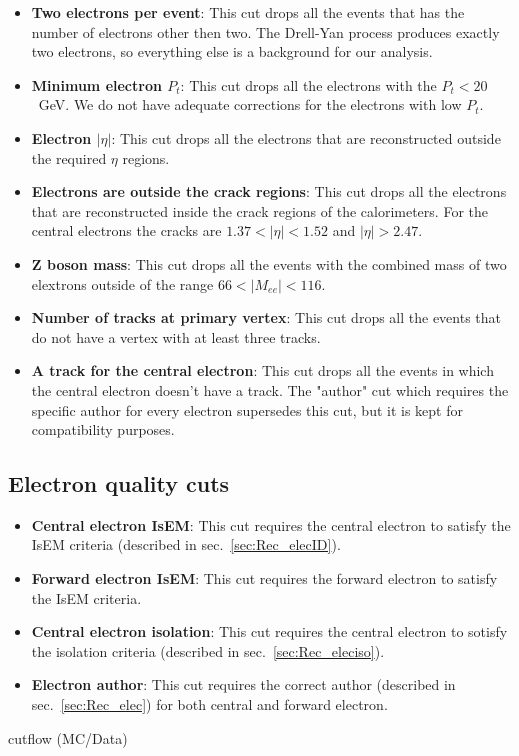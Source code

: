 \begin{itemize}
\item {\bfseries Two electrons per event}: This cut drops all the events that has the number of electrons other then two. The Drell-Yan process produces exactly two electrons, so everything else is a background for our analysis.
\item {\bfseries Minimum electron $P_{t}$}: This cut drops all the electrons with the $P_{t} < 20$~GeV. We do not have adequate corrections for the electrons with low $P_{t}$.
\item {\bfseries Electron $|\eta|$}: This cut drops all the electrons that are reconstructed outside the required $\eta$ regions.
\item {\bfseries Electrons are outside the crack regions}: This cut drops all the electrons that are reconstructed inside the crack regions of the calorimeters. For the central electrons the cracks are $1.37 < |\eta| < 1.52$ and $|\eta| > 2.47$.
\item {\bfseries Z boson mass}: This cut drops all the events with the combined mass of two elextrons outside of the range $66 < |M_{ee}| < 116$.
\item {\bfseries Number of tracks at primary vertex}: This cut drops all the events that do not have a vertex with at least three tracks.
\item {\bfseries A track for the central electron}: This cut drops all the events in which the central electron doesn't have a track. The "author" cut which requires the specific author for every electron supersedes this cut, but it is kept for compatibility purposes.
\end{itemize}

\subsection{Electron quality cuts}
\label{sec:Sel_isem_iso}

\begin{itemize}
\item {\bfseries Central electron IsEM}: This cut requires the central electron to satisfy the IsEM criteria (described in sec.~\ref{sec:Rec_elecID}).
\item {\bfseries Forward electron IsEM}: This cut requires the forward electron to satisfy the IsEM criteria.
\item {\bfseries Central electron isolation}: This cut requires the central electron to sotisfy the isolation criteria (described in sec.~\ref{sec:Rec_eleciso}).
\item {\bfseries Electron author}: This cut requires the correct author (described in sec.~\ref{sec:Rec_elec}) for both central and forward electron.
\end{itemize}

\tbu cutflow (MC/Data)
